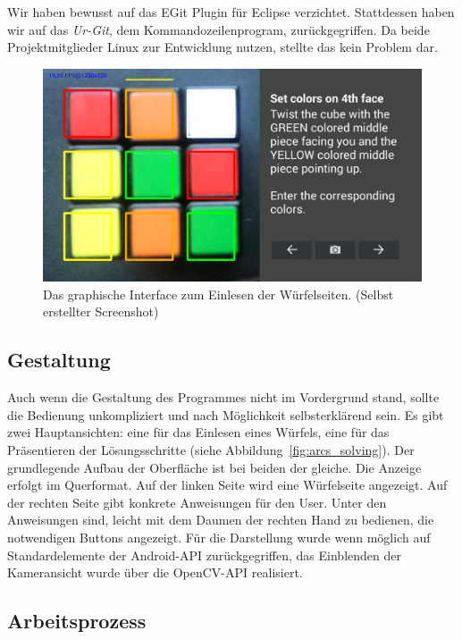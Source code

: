 Wir haben bewusst auf das EGit Plugin für Eclipse verzichtet. Stattdessen haben
wir auf das \emph{Ur-Git}, dem Kommandozeilenprogram, zurückgegriffen. Da beide
Projektmitglieder Linux zur Entwicklung nutzen, stellte das kein Problem dar.

\begin{figure}[ht!]
  \centering
  \includegraphics[width=\textwidth]{pics/arcs_unsolved}
  \caption{Das graphische Interface zum Einlesen der Würfelseiten.
  (Selbst erstellter Screenshot)}
  \label{fig:arcs_unsolved}
\end{figure}


\subsection{Gestaltung}  %

Auch wenn die Gestaltung des Programmes nicht im Vordergrund stand, sollte die
Bedienung unkompliziert und nach Möglichkeit selbsterklärend sein. Es gibt zwei
Hauptansichten: eine für das Einlesen eines Würfels, eine für das Präsentieren
der Lösungsschritte (siehe Abbildung~\ref{fig:arcs_solving}). Der grundlegende
Aufbau der Oberfläche ist bei beiden der gleiche. Die Anzeige erfolgt im
Querformat. Auf der linken Seite wird eine Würfelseite angezeigt. Auf der
rechten Seite gibt konkrete Anweisungen für den User. Unter den Anweisungen
sind, leicht mit dem Daumen der rechten Hand zu bedienen, die notwendigen
Buttons angezeigt. Für die Darstellung wurde wenn möglich auf Standardelemente
der Android-API zurückgegriffen, das Einblenden der Kameransicht wurde über die
OpenCV-API realisiert.

\subsection{Arbeitsprozess}  %

